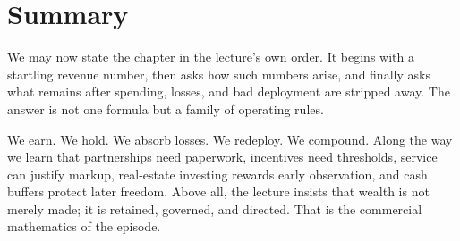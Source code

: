 \section{Summary}

We may now state the chapter in the lecture's own order. It begins with a startling revenue number, then asks how such numbers arise, and finally asks what remains after spending, losses, and bad deployment are stripped away. The answer is not one formula but a family of operating rules.

We earn. We hold. We absorb losses. We redeploy. We compound. Along the way we learn that partnerships need paperwork, incentives need thresholds, service can justify markup, real-estate investing rewards early observation, and cash buffers protect later freedom. Above all, the lecture insists that wealth is not merely made; it is retained, governed, and directed. That is the commercial mathematics of the episode.